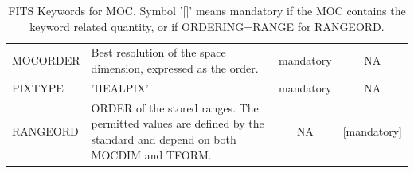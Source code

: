 \begin{table}[!htbp]
\begin{center}
{\begin{tabular} {|l | p{6cm}| c| c|}
   MOCORDER & Best resolution of the space dimension, expressed as the order. & mandatory & NA \\
   PIXTYPE & 'HEALPIX'  & mandatory & NA \\
   RANGEORD & ORDER of the stored ranges. The permitted values are defined by the standard and depend on both MOCDIM and TFORM. & NA & [mandatory] \\
   \hline
   \end{tabular}
   }
\end{center}
\caption[FITS Keywords for MOC]{FITS Keywords for MOC. Symbol '[]' means mandatory if the MOC contains the keyword related quantity, or if ORDERING=RANGE for RANGEORD.}
\label{table:fits_stmoc}
\end{table}
